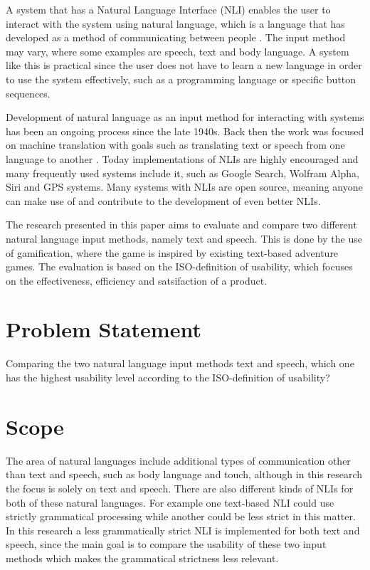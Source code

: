 A system that has a Natural Language Interface (NLI) enables the user to interact with the system using natural language, which is a language that has developed as a method of communicating between people \citep{NatLan}. The input method may vary, where some examples are speech, text and body language. A system like this is practical since the user does not have to learn a new language in order to use the system effectively, such as a programming language or specific button sequences.

Development of natural language as an input method for interacting with systems has been an ongoing process since the late 1940s. Back then the work was focused on machine translation with goals such as translating text or speech from one language to another \citep{Jones}. Today implementations of NLIs are highly encouraged and many frequently used systems include it, such as Google Search, Wolfram Alpha, Siri and GPS systems. Many systems with NLIs are open source, meaning anyone can make use of and contribute to the development of even better NLIs.

The research presented in this paper aims to evaluate and compare two different natural language input methods, namely text and speech. This is done by the use of gamification, where the game is inspired by existing text-based adventure games. The evaluation is based on the ISO-definition of usability, which focuses on the effectiveness, efficiency and satsifaction of a product. \citep{ISO}

\section{Problem Statement}
Comparing the two natural language input methods text and speech, which one has the highest usability level according to the ISO-definition of usability?

\section{Scope}
The area of natural languages include additional types of communication other than text and speech, such as body language and touch, although in this research the focus is solely on text and speech. There are also different kinds of NLIs for both of these natural languages. For example one text-based NLI could use strictly grammatical processing while another could be less strict in this matter. In this research a less grammatically strict NLI is implemented for both text and speech, since the main goal is to compare the usability of these two input methods which makes the grammatical strictness less relevant.

